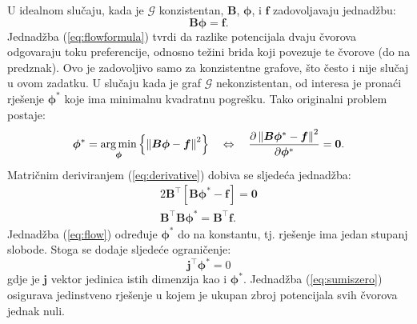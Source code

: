 \documentclass[lmodern, utf8, diplomski, numeric]{fer}
\newcommand{\matr}[1]{\mathbold{#1}}
\newcommand{\graph}[1]{\mathcal{#1}}
\newcommand{\T}{\top}
\newcommand{\q}{\left}
\newcommand{\w}{\right}
\DeclareMathOperator*{\argmin}{arg\min}
\begin{document}
  U idealnom slučaju, kada je $\graph{G}$ konzistentan, $\matr{B}$, $\matr{\phi}$, i $\matr{f}$ zadovoljavaju jednadžbu:
  \begin{equation}
  \label{eq:flowformula}
  \matr{B} \matr{\phi} = \matr{f}.
  \end{equation}
  Jednadžba (\ref{eq:flowformula}) tvrdi da razlike potencijala dvaju čvorova odgovaraju toku preferencije, odnosno težini brida koji povezuje te čvorove (do na predznak).
  Ovo je zadovoljivo samo za konzistentne grafove, što često i nije slučaj u ovom zadatku.
  U slučaju kada je graf $\graph{G}$ nekonzistentan, od interesa je pronaći rješenje $\matr{\phi^*}$ koje ima minimalnu kvadratnu pogrešku.
  Tako originalni problem postaje:
  \begin{gather}
  \label{eq:derivative}
  \matr{\phi^*} = \argmin_{\matr{\phi}} \q\{ \q \lVert \matr{B} \matr{\phi} - \matr{f}\textsl{} \w \rVert ^ 2 \w\} \quad
  \Leftrightarrow \quad 
  \frac{\partial \q \lVert \matr{B} \matr{\phi^*} - \matr{f} \w \rVert ^ 2}{\partial \matr{\phi^*}} = \mathbf{0}.
  \end{gather}
  Matričnim deriviranjem (\ref{eq:derivative}) dobiva se sljedeća jednadžba:
  \begin{gather}
  2 \matr{B}^\T \q[\matr{B} \matr{\phi^*} - \matr{f} \w] = \mathbf{0} \nonumber \\
  \label{eq:flow}
  \matr{B}^\T \matr{B} \matr{\phi^*} = \matr{B}^\T \matr{f}.
  \end{gather}
  Jednadžba (\ref{eq:flow}) određuje $\matr{\phi^*}$ do na konstantu, tj. rješenje ima jedan stupanj slobode.
  Stoga se dodaje sljedeće ograničenje:
  \begin{equation}
  \label{eq:sumiszero}
  \matr{j}^\T \matr{\phi^*} = 0
  \end{equation}
  gdje je $\matr{j}$ vektor jedinica istih dimenzija kao i $\matr{\phi^*}$.
  Jednadžba (\ref{eq:sumiszero}) osigurava jedinstveno rješenje u kojem je ukupan zbroj potencijala svih čvorova jednak nuli.
  
\end{document}
